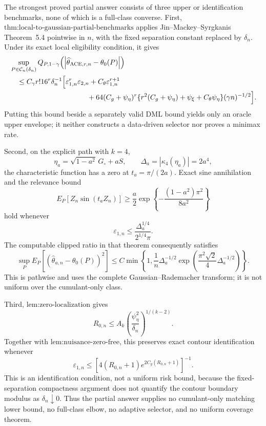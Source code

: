 The strongest proved partial answer consists of three upper or identification benchmarks, none of which is a full-class converse.  First, \(\text{thm:local-to-gaussian-partial-benchmarks}\) applies Jin--Mackey--Syrgkanis Theorem~5.4 pointwise in \(n\), with the fixed separation constant replaced by \(\delta_n\).  Under its exact local eligibility condition, it gives
\[
\begin{aligned}
 &\sup_{P\in\mathcal C_n(\delta_n)}
 Q_{P,1-\gamma}
 \!\left(\left|\widehat\theta_{\mathrm{ACE},r,n}-\theta_0(P)\right|\right)\\
 &\quad\le
 C_{\gamma}r!16^r\delta_n^{-1}
 \Bigl[
   \varepsilon_{1,n}^r\varepsilon_{2,n}
   +C_{\theta}\varepsilon_{1,n}^{r+1}\\
 &\hspace{38mm}
   +64(C_g+\psi_{\eta})^r
    \{r^2(C_g+\psi_{\eta})+\psi_{\xi}+C_{\theta}\psi_{\eta}\}
    (\gamma n)^{-1/2}
 \Bigr].
\end{aligned}
\]
Putting this bound beside a separately valid DML bound yields only an oracle upper envelope; it neither constructs a data-driven selector nor proves a minimax rate.

Second, on the explicit path with \(k=4\),
\[
 \eta_a=\sqrt{1-a^2}\,G_{\circ}+aS,
 \qquad
 \Delta_a=|\kappa_4(\eta_a)|=2a^4,
\]
the characteristic function has a zero at \(t_a=\pi/(2a)\).  Exact sine annihilation and the relevance bound
\[
 E_P[Z_n\sin(t_aZ_n)]
 \ge \frac a2
 \exp\!\left\{-\frac{(1-a^2)\pi^2}{8a^2}\right\}
\]
hold whenever
\[
 \varepsilon_{1,n}
 \le \frac{\Delta_a^{1/4}}{2^{1/4}\pi}.
\]
The computable clipped ratio in that theorem consequently satisfies
\[
 \sup_P E_P\!\left[(\widehat\theta_{a,n}-\theta_0(P))^2\right]
 \le
 C\min\!\left\{
  1,\frac1n\Delta_a^{-1/2}
  \exp\!\left(\frac{\pi^2\sqrt2}{4}\Delta_a^{-1/2}\right)
 \right\}.
\]
This is pathwise and uses the complete Gaussian--Rademacher transform; it is not uniform over the cumulant-only class.

Third, \(\text{lem:zero-localization}\) gives
\[
 R_{0,n}
 \le A_k\left(\frac{\psi_{\eta}^2}{\delta_n}\right)^{1/(k-2)}.
\]
Together with \(\text{lem:nuisance-zero-free}\), this preserves exact contour identification whenever
\[
 \varepsilon_{1,n}
 \le
 \left[4(R_{0,n}+1)e^{2C_g(R_{0,n}+1)}\right]^{-1}.
\]
This is an identification condition, not a uniform risk bound, because the fixed-separation compactness argument does not quantify the contour boundary modulus as \(\delta_n\downarrow0\).  Thus the partial answer supplies no cumulant-only matching lower bound, no full-class elbow, no adaptive selector, and no uniform coverage theorem.